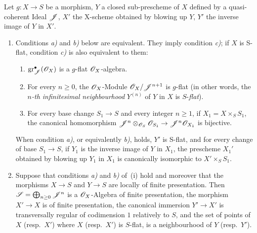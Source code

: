 \begin{proposition}[19.4.6]
\label{IV.19.4.6}
Let $g:X\to S$ be a morphism, $Y$ a closed sub-prescheme of $X$ defined by a quasi-coherent Ideal $\mathscr{J}$, $X'$ the X-scheme obtained by blowing up $Y$, $Y'$ the inverse image of $Y$ in $X'$.
\begin{enumerate}[label=\textup{(\roman*)}]
  \item Conditions \emph{a)} and \emph{b)} below are equivalent. They imply condition \emph{c)}; if $X$ is S-flat, condition \emph{c)} is also equivalent to them:
  \begin{enumerate}[label=\emph{\alph*)}]
    \item $\operatorname{gr}_{\mathscr{J}}^\bullet(\mathscr{O}_X)$ is a $g$-flat $\mathscr{O}_X$-algebra.
    \item For every $n\geq 0$, the $\mathscr{O}_X$-Module $\mathscr{O}_X/\mathscr{J}^{n+1}$ is $g$-flat \textup{(in other words, the \emph{$n$-th infinitesimal neighbourhood} $Y^{(n)}$ of $Y$ in $X$  is $S$-\emph{flat})}.
    \item For every base change $S_1\to S$ and every integer $n\geq 1$, if $X_1=X\times_S S_1$, the canonical homomorphism $\mathscr{J}^n\otimes_{\mathscr{O}_S}\mathscr{O}_{S_1}\to\mathscr{J}^n\mathscr{O}_{X_1}$ is bijective.
  \end{enumerate}
When condition \emph{a)}, or equivalently \emph{b)}, holds, $Y'$ is S-flat, and for every change of base $S_1\to S$, if $Y_1$ is the inverse image of $Y$ in $X_1$, the prescheme $X_1'$ obtained by blowing up $Y_1$ in $X_1$ is canonically isomorphic to $X'\times_S S_1$.
  \item Suppose that conditions \emph{a)} and \emph{b)} of~\textup{(i)} hold and moreover that the morphisms $X\to S$ and $Y\to S$ are locally of finite presentation.
Then $\mathscr{S}=\bigoplus_{n\geq 0}\mathscr{J}^n$ is a $\mathscr{O}_X$-Algebra of finite presentation, the morphism $X'\to X$ is of finite presentation, the canonical immersion $Y'\to X'$ is transversally regular of codimension $1$ relatively to $S$, and the set of points of $X$ \textup{(resp.\ $X'$)} where $X$ \textup{(resp.\ $X'$)} is $S$-flat, is a neighbourhood of $Y$ \textup{(resp.\ $Y'$)}.
\end{enumerate}
\end{proposition}

